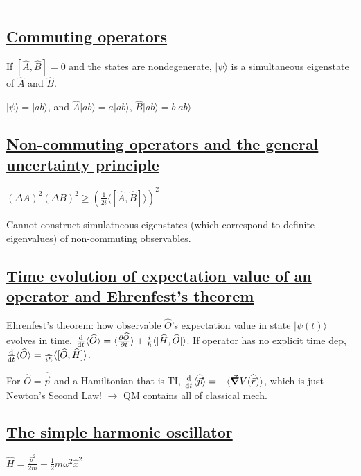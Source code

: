 \smallskip \hrule height 0.3pt

\subsection{\underline{Commuting operators}}
If $[\widehat{A}, \widehat{B}] = 0$ and the states are nondegenerate, $|\psi \rangle$ is a simultaneous eigenstate of $\widehat{A}$ and $\widehat{B}$.

$|\psi \rangle = |ab \rangle$, and $\widehat{A} | ab \rangle = a | ab \rangle$, $\widehat{B} | ab \rangle = b | ab \rangle$

\subsection{\underline{Non-commuting operators and the general uncertainty principle}}

$(\Delta A)^2 (\Delta B)^2 \geq (\frac{1}{2i} \langle [ \widehat{A}, \widehat{B} ] \rangle)^2$

Cannot construct simulatneous eigenstates (which correspond to definite eigenvalues) of non-commuting observables.

\subsection{\underline{Time evolution of expectation value of an operator and Ehrenfest's theorem}}

Ehrenfest's theorem: how observable $\widehat{O}$'s expectation value in state $|\psi(t) \rangle$ evolves in time, $\dv{}{t} \langle \widehat{O} \rangle = \langle \pdv{\widehat{O}}{t} \rangle + \frac{i}{\hbar} \langle [ \widehat{H}, \widehat{O} ] \rangle$.
If operator has no explicit time dep, $\dv{}{t} \langle \widehat{O} \rangle = \frac{1}{i \hbar} \langle [ \widehat{O}, \widehat{H} ] \rangle$.

For $\widehat{O} = \widehat{\vec{p}}$ and a Hamiltonian that is TI, $\dv{}{t} \langle \widehat{\vec{p}} \rangle = - \langle \vec{\grad} V(\widehat{\vec{r}}) \rangle$, which is just Newton's Second Law! $\rightarrow$ QM contains all of classical mech.

\subsection{\underline{The simple harmonic oscillator}}

$\widehat{H} = \frac{\widehat{p}^2}{2m} + \frac{1}{2} m \omega^2 \widehat{x}^2$

